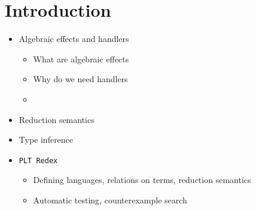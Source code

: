\documentclass[inz, english, shortabstract]{iithesis}
\author         {Maciej Buszka}
\newcommand{\Redex}{\texttt{PLT Redex} }
\begin{document}

\chapter{Introduction}



% 


\begin{itemize}
  \item Algebraic effects and handlers
  \begin{itemize}
    \item What are algebraic effects
    \item Why do we need handlers
    \item 
  \end{itemize}
  
  \item Reduction semantics
  
  \item Type inference
  
  \item \Redex
  \begin{itemize}
    \item Defining languages, relations on terms, reduction semantics
    \item Automatic testing, counterexample search
  \end{itemize}
\end{itemize}
\end{document}
